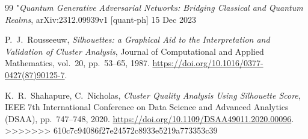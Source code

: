 \documentclass[a4paper]{article}
\begin{document}
\begin{thebibliography}{99}
 "\textit{Quantum Generative Adversarial Networks: Bridging Classical and Quantum Realms}, arXiv:2312.09939v1 [quant-ph] 15 Dec 2023

P.~J.~Rousseeuw, \textit{Silhouettes: a Graphical Aid to the Interpretation and Validation of Cluster Analysis}, Journal of Computational and Applied Mathematics, vol.~20, pp.~53--65, 1987. \url{https://doi.org/10.1016/0377-0427(87)90125-7}.

K.~R.~Shahapure, C.~Nicholas, \textit{Cluster Quality Analysis Using Silhouette Score}, IEEE 7th International Conference on Data Science and Advanced Analytics (DSAA), pp.~747--748, 2020. \url{https://doi.org/10.1109/DSAA49011.2020.00096}.
>>>>>>> 610c7c94086f27e24572c8933e5219a773353c39

\end{thebibliography}
\end{document}

